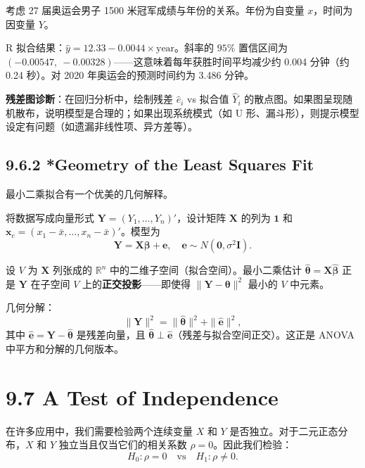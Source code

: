 \begin{example}[男子 1500 米奥运会成绩]\label{ex:olympic-1500m}
考虑 27 届奥运会男子 1500 米冠军成绩与年份的关系。年份为自变量 $x$，时间为因变量 $Y$。

R 拟合结果：$\hat{y} = 12.33 - 0.0044 \times \text{year}$。斜率的 $95\%$ 置信区间为 $(-0.00547,\ -0.00328)$——这意味着每年获胜时间平均减少约 0.004 分钟（约 0.24 秒）。对 2020 年奥运会的预测时间约为 3.486 分钟。
\end{example}

\textbf{残差图诊断}：在回归分析中，绘制残差 $\hat{e}_i$ vs 拟合值 $\hat{Y}_i$ 的散点图。如果图呈现随机散布，说明模型是合理的；如果出现系统模式（如 U 形、漏斗形），则提示模型设定有问题（如遗漏非线性项、异方差等）。

\subsection{9.6.2 *Geometry of the Least Squares Fit}\label{sec:9.6.2}

最小二乘拟合有一个优美的几何解释。

将数据写成向量形式 $\mathbf{Y} = (Y_1, \ldots, Y_n)'$，设计矩阵 $\mathbf{X}$ 的列为 $\mathbf{1}$ 和 $\mathbf{x}_c = (x_1 - \bar{x}, \ldots, x_n - \bar{x})'$。模型为
\[
\mathbf{Y} = \mathbf{X}\boldsymbol{\beta} + \mathbf{e},\quad \mathbf{e} \sim N(\mathbf{0}, \sigma^2\mathbf{I}).
\label{eq:regression-matrix-model}
\]

设 $V$ 为 $\mathbf{X}$ 列张成的 $\mathbb{R}^n$ 中的二维子空间（拟合空间）。最小二乘估计 $\hat{\boldsymbol{\theta}} = \mathbf{X}\hat{\boldsymbol{\beta}}$ 正是 $\mathbf{Y}$ 在子空间 $V$ 上的\textbf{正交投影}——即使得 $\|\mathbf{Y} - \boldsymbol{\theta}\|^2$ 最小的 $V$ 中元素。

几何分解：
\[
\|\mathbf{Y}\|^2 = \|\hat{\boldsymbol{\theta}}\|^2 + \|\hat{\mathbf{e}}\|^2,
\]
其中 $\hat{\mathbf{e}} = \mathbf{Y} - \hat{\boldsymbol{\theta}}$ 是残差向量，且 $\hat{\boldsymbol{\theta}} \perp \hat{\mathbf{e}}$（残差与拟合空间正交）。这正是 ANOVA 中平方和分解的几何版本。

\section{9.7 A Test of Independence}\label{sec:9.7}

在许多应用中，我们需要检验两个连续变量 $X$ 和 $Y$ 是否独立。对于二元正态分布，$X$ 和 $Y$ 独立当且仅当它们的相关系数 $\rho = 0$。因此我们检验：
\[
H_0: \rho = 0 \quad \text{vs} \quad H_1: \rho \neq 0.
\label{eq:independence-hypotheses}
\]

